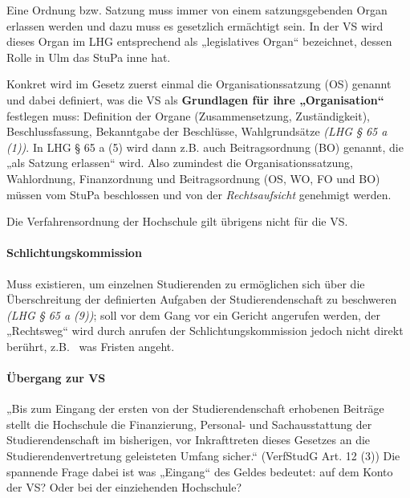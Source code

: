 \documentclass[
10pt,
a4paper,
twoside,								%
titlepage=false,							%
draft=false								%
]{scrartcl}
\begin{document}
Eine Ordnung bzw. Satzung muss immer von einem satzungsgebenden Organ erlassen werden und dazu muss es gesetzlich ermächtigt sein. In der VS wird dieses Organ im LHG entsprechend als „legislatives Organ“ bezeichnet, dessen Rolle in Ulm das StuPa inne hat.


Konkret wird im Gesetz zuerst einmal die Organisationssatzung (OS) genannt und dabei definiert, was die VS als \textbf{Grundlagen für ihre „Organisation“} festlegen muss: Definition der Organe (Zusammensetzung, Zuständigkeit), Beschlussfassung, Bekanntgabe der Beschlüsse, Wahlgrundsätze \textit{(LHG § 65 a (1))}. In LHG § 65 a (5) wird dann z.B. auch Beitragsordnung (BO) genannt, die „als Satzung erlassen“ wird. Also zumindest die Organisationssatzung, Wahlordnung, Finanzordnung und Beitragsordnung (OS, WO, FO und BO) müssen vom StuPa beschlossen und von der \emph{Rechtsaufsicht} genehmigt werden.

Die Verfahrensordnung der Hochschule gilt übrigens nicht für die VS.



\paragraph{Schlichtungskommission}

Muss existieren, um einzelnen Studierenden zu ermöglichen sich über die Überschreitung der definierten Aufgaben der Studierendenschaft zu beschweren \textit{(LHG § 65 a (9))}; soll vor dem Gang vor ein Gericht angerufen werden, der „Rechtsweg“ wird durch anrufen der Schlichtungskommission jedoch nicht direkt berührt, z.B.~ was Fristen angeht.



\paragraph{Übergang zur VS}

„Bis zum Eingang der ersten von der Studierendenschaft erhobenen Beiträge stellt die Hochschule die Finanzierung, Personal- und Sachausstattung der Studierendenschaft im bisherigen, vor Inkrafttreten dieses Gesetzes an die Studierendenvertretung geleisteten Umfang sicher.“ (VerfStudG Art. 12 (3)) Die spannende Frage dabei ist was „Eingang“ des Geldes bedeutet: auf dem Konto der VS? Oder bei der einziehenden Hochschule?
\end{document}
